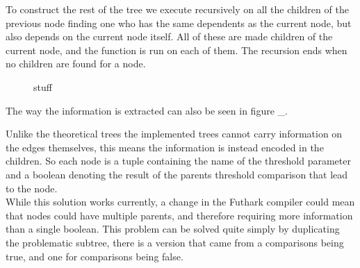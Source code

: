 To construct the rest of the tree we execute recursively on all the children
of the previous node finding one who has the same dependents as the current
node, but also depends on the current node itself. All of these are made
children of the current node, and the function is run on each of them. The
recursion ends when no children are found for a node.
\begin{figure}
	\centering
	
	\caption{stuff}
\end{figure}


The way the information is extracted can also be seen in figure \_. 

Unlike the theoretical trees the implemented trees cannot carry information on
the edges themselves, this means the information is instead encoded in the
children. So each node is a tuple containing the name of the threshold
parameter and a boolean denoting the result of the parents threshold
comparison that lead to the node.\\
While this solution works currently, a change in the Futhark compiler could
mean that nodes could have multiple parents, and therefore requiring more
information than a single boolean. This problem can be solved quite simply by
duplicating the problematic subtree, there is a version that came from a
comparisons being true, and one for comparisons being false.


